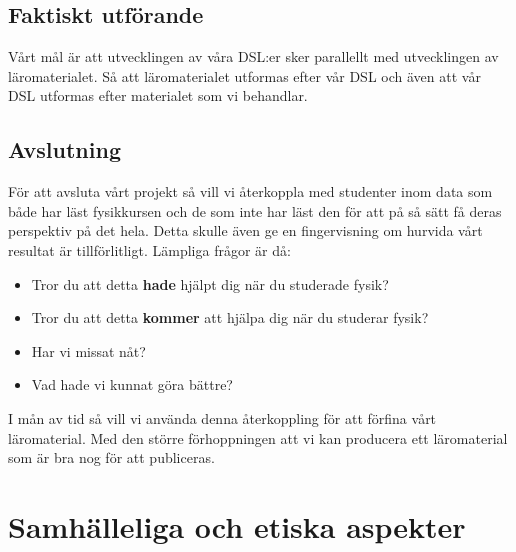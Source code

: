 \documentclass[12pt,a4paper]{article}
\begin{document}
\subsection{Faktiskt utförande}

Vårt mål är att utvecklingen av våra DSL:er sker parallellt med utvecklingen av läromaterialet. Så att läromaterialet utformas efter vår DSL och även att vår DSL utformas efter materialet som vi behandlar.



\subsection{Avslutning}

För att avsluta vårt projekt så vill vi återkoppla med studenter inom data som både har läst fysikkursen och de som inte har läst den för att på så sätt få deras perspektiv på det hela. Detta skulle även ge en fingervisning om hurvida vårt resultat är tillförlitligt. Lämpliga frågor är då:

\begin{itemize}
    \item Tror du att detta \textbf{hade} hjälpt dig när du studerade fysik?
    \item Tror du att detta \textbf{kommer} att hjälpa dig när du studerar fysik?
    \item Har vi missat nåt?
    \item Vad hade vi kunnat göra bättre?
\end{itemize}

I mån av tid så vill vi använda denna återkoppling för att förfina vårt läromaterial. Med den större förhoppningen att vi kan producera ett läromaterial som är bra nog för att publiceras.

\section{Samhälleliga och etiska aspekter}
\end{document}
